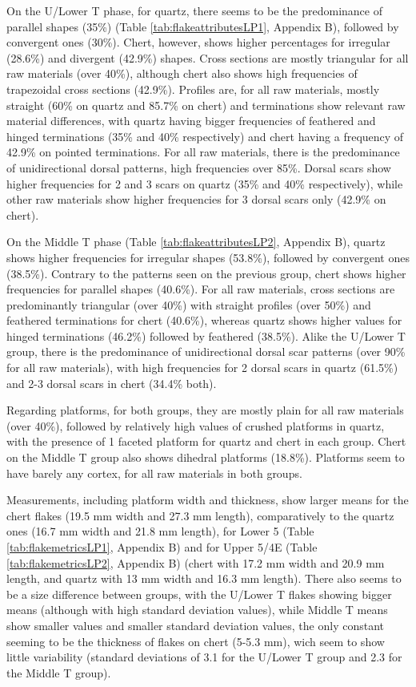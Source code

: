 \documentclass[12pt,twoside]{reedthesis}
\begin{document}
On the U/Lower T phase, for quartz, there seems to be the predominance of parallel shapes (35\%) (Table \ref{tab:flakeattributesLP1}, Appendix B), followed by convergent ones (30\%). Chert, however, shows higher percentages for irregular (28.6\%) and divergent (42.9\%) shapes. Cross sections are mostly triangular for all raw materials (over 40\%), although chert also shows high frequencies of trapezoidal cross sections (42.9\%). Profiles are, for all raw materials, mostly straight (60\% on quartz and 85.7\% on chert) and terminations show relevant raw material differences, with quartz having bigger frequencies of feathered and hinged terminations (35\% and 40\% respectively) and chert having a frequency of 42.9\% on pointed terminations. For all raw materials, there is the predominance of unidirectional dorsal patterns, high frequencies over 85\%. Dorsal scars show higher frequencies for 2 and 3 scars on quartz (35\% and 40\% respectively), while other raw materials show higher frequencies for 3 dorsal scars only (42.9\% on chert).

On the Middle T phase (Table \ref{tab:flakeattributesLP2}, Appendix B), quartz shows higher frequencies for irregular shapes (53.8\%), followed by convergent ones (38.5\%). Contrary to the patterns seen on the previous group, chert shows higher frequencies for parallel shapes (40.6\%). For all raw materials, cross sections are predominantly triangular (over 40\%) with straight profiles (over 50\%) and feathered terminations for chert (40.6\%), whereas quartz shows higher values for hinged terminations (46.2\%) followed by feathered (38.5\%). Alike the U/Lower T group, there is the predominance of unidirectional dorsal scar patterns (over 90\% for all raw materials), with high frequencies for 2 dorsal scars in quartz (61.5\%) and 2-3 dorsal scars in chert (34.4\% both).

Regarding platforms, for both groups, they are mostly plain for all raw materials (over 40\%), followed by relatively high values of crushed platforms in quartz, with the presence of 1 faceted platform for quartz and chert in each group. Chert on the Middle T group also shows dihedral platforms (18.8\%). Platforms seem to have barely any cortex, for all raw materials in both groups.

Measurements, including platform width and thickness, show larger means for the chert flakes (19.5 mm width and 27.3 mm length), comparatively to the quartz ones (16.7 mm width and 21.8 mm length), for Lower 5 (Table \ref{tab:flakemetricsLP1}, Appendix B) and for Upper 5/4E (Table \ref{tab:flakemetricsLP2}, Appendix B) (chert with 17.2 mm width and 20.9 mm length, and quartz with 13 mm width and 16.3 mm length). There also seems to be a size difference between groups, with the U/Lower T flakes showing bigger means (although with high standard deviation values), while Middle T means show smaller values and smaller standard deviation values, the only constant seeming to be the thickness of flakes on chert (5-5.3 mm), wich seem to show little variability (standard deviations of 3.1 for the U/Lower T group and 2.3 for the Middle T group).
\end{document}

